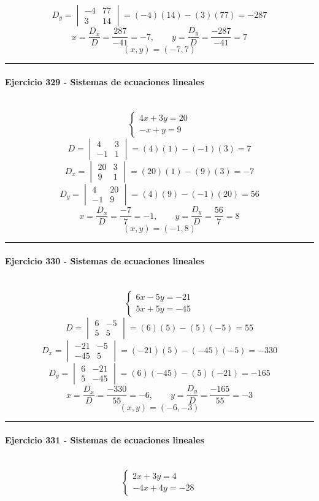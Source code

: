 \documentclass[10pt,a4paper]{article}
\newcommand{\res}[1]{\paragraph{#1}\mbox{}\\[-1.2em]}
\begin{document}
\[ D_y=\begin{vmatrix}-4&77\\3&14\end{vmatrix}=(-4)(14)-(3)(77)=-287 \]
\[ x=\frac{D_x}{D}=\frac{287}{-41}=-7,\qquad y=\frac{D_y}{D}=\frac{-287}{-41}=7 \]
\[ \boxed{(x,y)=(-7,7)} \]
\vspace{1mm}\hrule\vspace{2mm}
\res{Ejercicio 329 - Sistemas de ecuaciones lineales}
\[ \begin{cases}4 x + 3 y=20\\- x + y=9\end{cases} \]
\[ D=\begin{vmatrix}4&3\\-1&1\end{vmatrix}=(4)(1)-(-1)(3)=7 \]
\[ D_x=\begin{vmatrix}20&3\\9&1\end{vmatrix}=(20)(1)-(9)(3)=-7 \]
\[ D_y=\begin{vmatrix}4&20\\-1&9\end{vmatrix}=(4)(9)-(-1)(20)=56 \]
\[ x=\frac{D_x}{D}=\frac{-7}{7}=-1,\qquad y=\frac{D_y}{D}=\frac{56}{7}=8 \]
\[ \boxed{(x,y)=(-1,8)} \]
\vspace{1mm}\hrule\vspace{2mm}
\res{Ejercicio 330 - Sistemas de ecuaciones lineales}
\[ \begin{cases}6 x - 5 y=-21\\5 x + 5 y=-45\end{cases} \]
\[ D=\begin{vmatrix}6&-5\\5&5\end{vmatrix}=(6)(5)-(5)(-5)=55 \]
\[ D_x=\begin{vmatrix}-21&-5\\-45&5\end{vmatrix}=(-21)(5)-(-45)(-5)=-330 \]
\[ D_y=\begin{vmatrix}6&-21\\5&-45\end{vmatrix}=(6)(-45)-(5)(-21)=-165 \]
\[ x=\frac{D_x}{D}=\frac{-330}{55}=-6,\qquad y=\frac{D_y}{D}=\frac{-165}{55}=-3 \]
\[ \boxed{(x,y)=(-6,-3)} \]
\vspace{1mm}\hrule\vspace{2mm}
\res{Ejercicio 331 - Sistemas de ecuaciones lineales}
\[ \begin{cases}2 x + 3 y=4\\- 4 x + 4 y=-28\end{cases} \]
\end{document}
